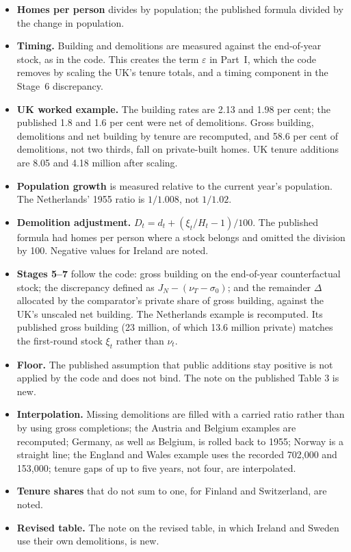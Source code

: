 \documentclass[11pt,a4paper]{article}
\begin{document}
\begin{itemize}[leftmargin=*]
  \item \textbf{Homes per person} divides by population; the published formula divided by
        the change in population.
  \item \textbf{Timing.} Building and demolitions are measured against the end-of-year
        stock, as in the code. This creates the term $\varepsilon$ in Part~I, which the
        code removes by scaling the UK's tenure totals, and a timing component in the
        Stage~6 discrepancy.
  \item \textbf{UK worked example.} The building rates are 2.13 and 1.98 per cent; the
        published 1.8 and 1.6 per cent were net of demolitions. Gross building,
        demolitions and net building by tenure are recomputed, and 58.6 per cent of
        demolitions, not two thirds, fall on private-built homes. UK tenure additions are
        8.05 and 4.18 million after scaling.
  \item \textbf{Population growth} is measured relative to the current year's population.
        The Netherlands' 1955 ratio is $1/1.008$, not $1/1.02$.
  \item \textbf{Demolition adjustment.} $D_t = d_t + (\xi_t / H_t - 1)/100$. The published
        formula had homes per person where a stock belongs and omitted the division by
        100. Negative values for Ireland are noted.
  \item \textbf{Stages 5--7} follow the code: gross building on the end-of-year
        counterfactual stock; the discrepancy defined as $J_N - (\nu_T - \sigma_0)$; and
        the remainder $\Delta$ allocated by the comparator's private share of gross
        building, against the UK's unscaled net building. The Netherlands example is
        recomputed. Its published gross building (23 million, of which 13.6 million
        private) matches the first-round stock $\xi_t$ rather than $\nu_t$.
  \item \textbf{Floor.} The published assumption that public additions stay positive is
        not applied by the code and does not bind. The note on the published Table 3 is new.
  \item \textbf{Interpolation.} Missing demolitions are filled with a carried ratio rather
        than by using gross completions; the Austria and Belgium examples are recomputed;
        Germany, as well as Belgium, is rolled back to 1955; Norway is a straight line; the
        England and Wales example uses the recorded 702,000 and 153,000; tenure gaps of up
        to five years, not four, are interpolated.
  \item \textbf{Tenure shares} that do not sum to one, for Finland and Switzerland, are
        noted.
  \item \textbf{Revised table.} The note on the revised table, in which Ireland and Sweden use
        their own demolitions, is new.
\end{itemize}
\end{document}

